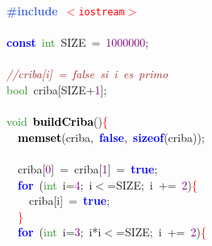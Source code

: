 
{\ttfamily \raggedright {
\noindent
\mbox{}\textbf{\textcolor{RoyalBlue}{\#include}}\ \texttt{\textcolor{Red}{$<$iostream$>$}} \\
\mbox{} \\
\mbox{}\textbf{\textcolor{Blue}{const}}\ \textcolor{ForestGreen}{int}\ SIZE\ \textcolor{BrickRed}{=}\ \textcolor{Purple}{1000000}\textcolor{BrickRed}{;} \\
\mbox{} \\
\mbox{}\textit{\textcolor{Brown}{//criba[i]\ =\ false\ si\ i\ es\ primo}} \\
\mbox{}\textcolor{ForestGreen}{bool}\ criba\textcolor{BrickRed}{[}SIZE\textcolor{BrickRed}{+}\textcolor{Purple}{1}\textcolor{BrickRed}{];} \\
\mbox{} \\
\mbox{}\textcolor{ForestGreen}{void}\ \textbf{\textcolor{Black}{buildCriba}}\textcolor{BrickRed}{()}\textcolor{Red}{\{} \\
\mbox{}\ \ \textbf{\textcolor{Black}{memset}}\textcolor{BrickRed}{(}criba\textcolor{BrickRed}{,}\ \textbf{\textcolor{Blue}{false}}\textcolor{BrickRed}{,}\ \textbf{\textcolor{Blue}{sizeof}}\textcolor{BrickRed}{(}criba\textcolor{BrickRed}{));} \\
\mbox{} \\
\mbox{}\ \ criba\textcolor{BrickRed}{[}\textcolor{Purple}{0}\textcolor{BrickRed}{]}\ \textcolor{BrickRed}{=}\ criba\textcolor{BrickRed}{[}\textcolor{Purple}{1}\textcolor{BrickRed}{]}\ \textcolor{BrickRed}{=}\ \textbf{\textcolor{Blue}{true}}\textcolor{BrickRed}{;} \\
\mbox{}\ \ \textbf{\textcolor{Blue}{for}}\ \textcolor{BrickRed}{(}\textcolor{ForestGreen}{int}\ i\textcolor{BrickRed}{=}\textcolor{Purple}{4}\textcolor{BrickRed}{;}\ i\textcolor{BrickRed}{$<$=}SIZE\textcolor{BrickRed}{;}\ i\ \textcolor{BrickRed}{+=}\ \textcolor{Purple}{2}\textcolor{BrickRed}{)}\textcolor{Red}{\{} \\
\mbox{}\ \ \ \ criba\textcolor{BrickRed}{[}i\textcolor{BrickRed}{]}\ \textcolor{BrickRed}{=}\ \textbf{\textcolor{Blue}{true}}\textcolor{BrickRed}{;} \\
\mbox{}\ \ \textcolor{Red}{\}} \\
\mbox{}\ \ \textbf{\textcolor{Blue}{for}}\ \textcolor{BrickRed}{(}\textcolor{ForestGreen}{int}\ i\textcolor{BrickRed}{=}\textcolor{Purple}{3}\textcolor{BrickRed}{;}\ i\textcolor{BrickRed}{*}i\textcolor{BrickRed}{$<$=}SIZE\textcolor{BrickRed}{;}\ i\ \textcolor{BrickRed}{+=}\ \textcolor{Purple}{2}\textcolor{BrickRed}{)}\textcolor{Red}{\{} \\
}}
